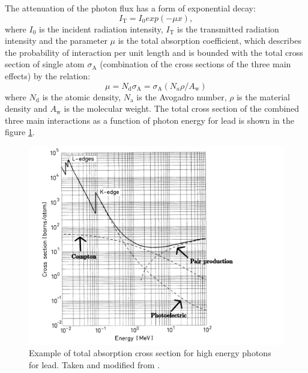 \par
The attenuation of the photon flux has a form of exponential decay:
\begin{equation}
I_{\textrm{T}} = I_{0}exp(-\mu x),
\end{equation}
where $I_{0}$ is the incident radiation intensity, $I_{\textrm{T}}$ is the transmitted radiation intensity and the parameter $\mu$ is the total absorption coefficient, which describes the probability of interaction per unit length and is bounded with the total cross section of single atom $\sigma_{\textrm{A}}$ (combination of the cross sections of the three main effects) by the relation:
\begin{equation}
 \mu = N_{\textrm{d}} \sigma_{\textrm{A}} = \sigma_{\textrm{A}}(N_{a}\rho/A_{\textrm{w}})
 \end{equation}
where $N_{\textrm{d}}$ is the atomic density, $N_{\textrm{a}}$ is the Avogadro number, $\rho$ is the material density and $A_{\textrm{w}}$ is the molecular weight. The total cross section of the combined three main interactions as a function of photon energy for lead is shown in the figure \ref{cross}.
\begin{figure}[H]
 \centering
 \includegraphics[scale=0.6, angle = 0]{./pictures/totalCross}
 \caption{Example of total absorption cross section for high energy photons for lead. Taken and modified from \cite{Leo1987-wy}.}
 \label{cross}
 
\end{figure}
 


